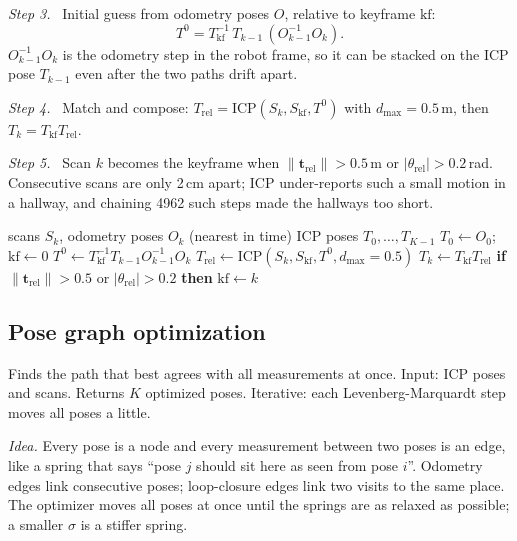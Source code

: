 \documentclass[letterpaper, 10pt, conference]{ieeeconf}
\newcommand{\tb}{\mathbf{t}}
\newcommand{\step}[1]{\par\noindent\textit{Step #1.}\ }
\newcommand{\summary}[1]{#1\par}
\begin{document}
\step{3} Initial guess from odometry poses $O$, relative to keyframe $\text{kf}$:
\begin{equation}
T^0=T_{\text{kf}}^{-1}\,T_{k-1}\,(O_{k-1}^{-1}O_k).
\end{equation}
$O_{k-1}^{-1}O_k$ is the odometry step in the robot frame, so it can be
stacked on the ICP pose $T_{k-1}$ even after the two paths drift apart.

\step{4} Match and compose:
$T_{\text{rel}}=\text{ICP}(S_k,S_{\text{kf}},T^0)$ with $d_{\max}=0.5$\,m, then $T_k=T_{\text{kf}}T_{\text{rel}}$.

\step{5} Scan $k$ becomes the keyframe when $\lVert\tb_{\text{rel}}\rVert>0.5$\,m
or $|\theta_{\text{rel}}|>0.2$\,rad. Consecutive scans are only 2\,cm apart;
ICP under-reports such a small motion in a hallway, and chaining 4962 such
steps made the hallways too short.

\begin{algorithm}[H]
\caption{Scan matching}\label{alg:scanmatching}
\footnotesize
\begin{algorithmic}[1]
\Require scans $S_k$, odometry poses $O_k$ (nearest in time)
\Ensure ICP poses $T_0,\dots,T_{K-1}$
\State $T_0\gets O_0$;\ \ $\text{kf}\gets0$
  \State $T^0\gets T_{\text{kf}}^{-1}T_{k-1}O_{k-1}^{-1}O_k$ 
  \State $T_{\text{rel}}\gets\text{ICP}(S_k,S_{\text{kf}},T^0,d_{\max}{=}0.5)$
  \State $T_k\gets T_{\text{kf}}T_{\text{rel}}$
  \State \textbf{if} $\lVert\tb_{\text{rel}}\rVert>0.5$ or $|\theta_{\text{rel}}|>0.2$ \textbf{then} $\text{kf}\gets k$
\EndFor
\end{algorithmic}
\end{algorithm}

\subsection{Pose graph optimization}

\summary{Finds the path that best agrees with all measurements at once.
Input: ICP poses and scans. Returns $K$ optimized poses. Iterative: each
Levenberg-Marquardt step moves all poses a little.}

\emph{Idea.} Every pose is a node and every measurement between two poses
is an edge, like a spring that says ``pose $j$ should sit here as seen from
pose $i$''. Odometry edges link consecutive poses; loop-closure edges link
two visits to the same place. The optimizer moves all poses at once until
the springs are as relaxed as possible; a smaller $\sigma$ is a stiffer
spring.
\end{document}
